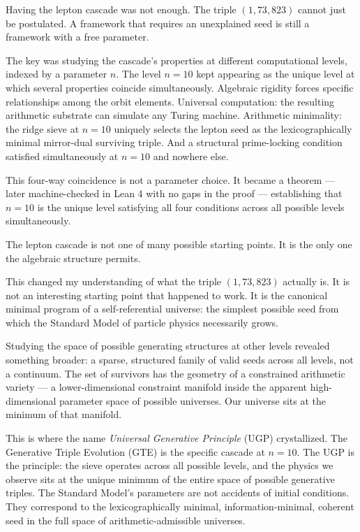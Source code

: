 \documentclass[11pt,openany]{book}
\theoremstyle{remark}
\begin{document}
\medskip

Having the lepton cascade was not enough.
The triple $(1, 73, 823)$ cannot just be postulated.
A framework that requires an unexplained seed is still a framework with a free parameter.

The key was studying the cascade's properties at different computational levels, indexed
by a parameter $n$.
The level $n = 10$ kept appearing as the unique level at which several properties
coincide simultaneously.
Algebraic rigidity forces specific relationships among the orbit elements.
Universal computation: the resulting arithmetic substrate can simulate any Turing machine.
Arithmetic minimality: the ridge sieve at $n = 10$ uniquely selects the lepton seed as
the lexicographically minimal mirror-dual surviving triple.
And a structural prime-locking condition satisfied simultaneously at $n = 10$ and nowhere
else.

This four-way coincidence is not a parameter choice.
It became a theorem --- later machine-checked in Lean 4 with no gaps in the proof ---
establishing that $n = 10$ is the unique level satisfying all four conditions across all
possible levels simultaneously.

The lepton cascade is not one of many possible starting points.
It is the only one the algebraic structure permits.

This changed my understanding of what the triple $(1, 73, 823)$ actually is.
It is not an interesting starting point that happened to work.
It is the canonical minimal program of a self-referential universe: the simplest possible
seed from which the Standard Model of particle physics necessarily grows.

Studying the space of possible generating structures at other levels revealed something
broader: a sparse, structured family of valid seeds across all levels, not a continuum.
The set of survivors has the geometry of a constrained arithmetic variety --- a
lower-dimensional constraint manifold inside the apparent high-dimensional parameter space
of possible universes.
Our universe sits at the minimum of that manifold.

This is where the name \emph{Universal Generative Principle} (UGP) crystallized.
The Generative Triple Evolution (GTE) is the specific cascade at $n = 10$.
The UGP is the principle: the sieve operates across all possible levels, and the physics
we observe sits at the unique minimum of the entire space of possible generative triples.
The Standard Model's parameters are not accidents of initial conditions.
They correspond to the lexicographically minimal, information-minimal, coherent seed
in the full space of arithmetic-admissible universes.
\end{document}
